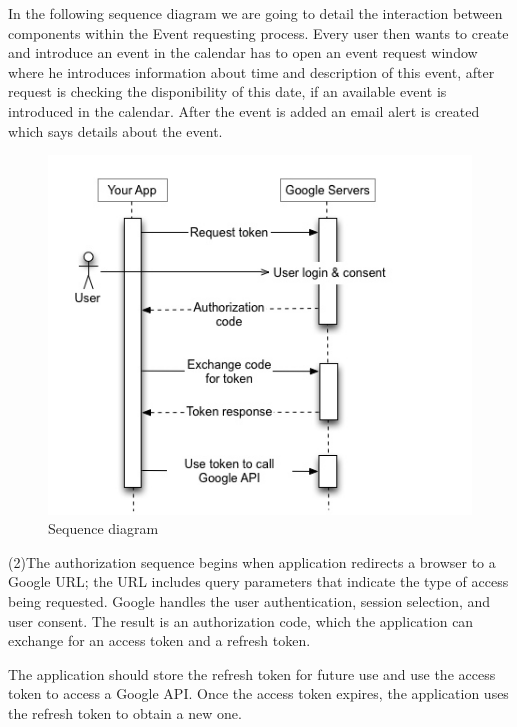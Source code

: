 \par In the following sequence diagram we are going to detail the interaction between components within the Event requesting process. Every user then wants to create and introduce an event in the calendar has to open an event request window where he introduces information about time and description of this event, after request is checking the disponibility of this date, if an available event is introduced in the calendar. After the event is added an email alert is created which says details about the event. 

\par 
\begin{figure}[h]
	\includegraphics[width=\textwidth]{Sequence_Diagram4}
	\caption{Sequence diagram}	
\end{figure}


\par (2)The authorization sequence begins when  application redirects a browser to a Google URL; the URL includes query parameters that indicate the type of access being requested. Google handles the user authentication, session selection, and user consent. The result is an authorization code, which the application can exchange for an access token and a refresh token.

The application should store the refresh token for future use and use the access token to access a Google API. Once the access token expires, the application uses the refresh token to obtain a new one.

